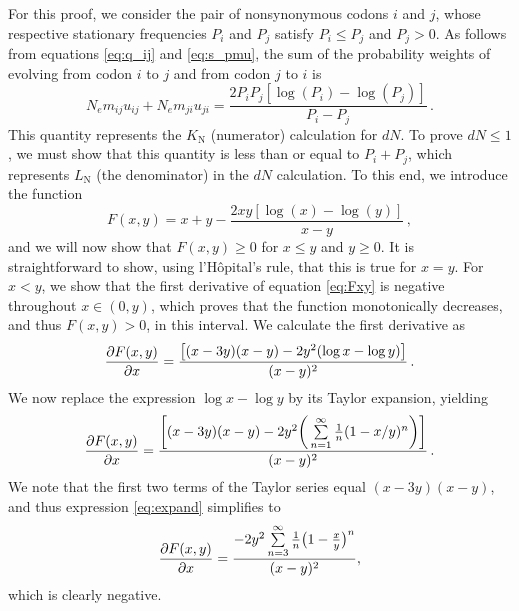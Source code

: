 \documentclass[11pt]{article}
\begin{document}
For this proof, we consider the pair of nonsynonymous codons $i$ and $j$, whose respective stationary frequencies $P_i$ and $P_j$ satisfy $P_i \leq P_j$ and $P_j > 0$. As follows from equations \eqref{eq:q_ij} and \eqref{eq:s_pmu}, the sum of the probability weights of evolving from codon $i$ to $j$ and from codon $j$ to $i$ is
\begin{equation}
N_em_{ij} u_{ij} + N_em_{ji} u_{ji}  = \frac{2P_iP_j[\log(P_i) - \log(P_j)]}{P_i - P_j} \,.
\end{equation}
This quantity represents the $K_\text{N}$ (numerator) calculation for $dN$. To prove $dN \leq 1$, we must show that this quantity is less than or equal to $P_i + P_j$, which represents $L_\text{N}$ (the denominator) in the $dN$ calculation. To this end, we introduce the function 
\begin{equation}\label{eq:Fxy}
F(x,y) = x + y - \frac{2xy[\log(x) - \log(y)]}{x - y} \,,
\end{equation}
and we will now show that $F(x,y) \geq 0$ for $x \leq y$ and $y \geq 0 $. It is straightforward to show, using l'H\^{o}pital's rule, that this is true for $x=y$. For $x < y$, we show that the first derivative of equation \eqref{eq:Fxy} is negative throughout $x \in (0,y)$, which proves that the function monotonically decreases, and thus $F(x,y) > 0$, in this interval. We calculate the first derivative as 
\begin{equation}
\frac{\partial{F(x,y)}}{\partial{x}} = \frac{\big{[} (x-3y)(x-y) - 2y^2(\log{x} - \log{y}) \big{]}}{(x-y)^2} \,.
\end{equation}
We now replace the expression $\log{x} - \log{y}$ by its Taylor expansion, yielding
\begin{equation}\label{eq:expand}
	\frac{\partial{F(x,y)}}{\partial{x}} = 
	\frac{ \bigg{[} (x-3y)(x-y) - 2y^2\bigg{(}\sum\limits_{n=1}^\infty \frac{1}{n} (1-x/y)^n\bigg{)} \bigg{]}}{(x-y)^2} \,.
\end{equation} We note that the first two terms of the Taylor series equal $(x-3y)(x-y)$, and thus expression \eqref{eq:expand} simplifies to 
\begin{equation}
\frac{\partial{F(x,y)}}{\partial{x}} = \frac{-2y^2\sum\limits_{n=3}^\infty \frac{1}{n} \big{(}1-\frac{x}{y}\big{)}^n}{(x-y)^2} ,
\end{equation}
which is clearly negative. 


\bigskip
\end{document}
